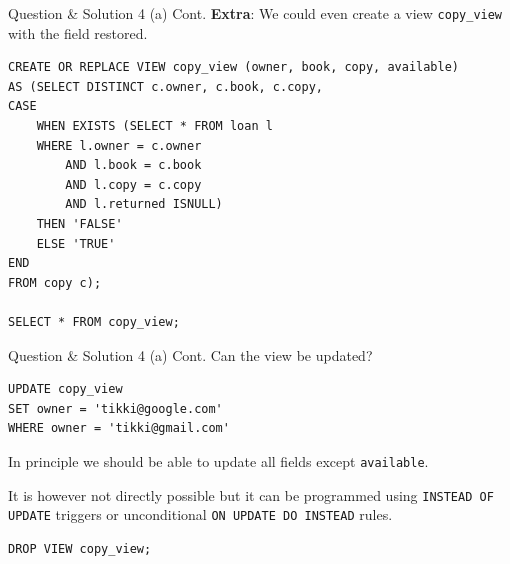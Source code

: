 \begin{frame}[fragile]{Question \& Solution 4 (a) Cont.}
\textbf{Extra}: We could even create a view \texttt{copy\_view} with the field restored.

\begin{lstlisting}
CREATE OR REPLACE VIEW copy_view (owner, book, copy, available) 
AS (SELECT DISTINCT c.owner, c.book, c.copy, 
CASE
	WHEN EXISTS (SELECT * FROM loan l  
	WHERE l.owner = c.owner
		AND l.book = c.book
		AND l.copy = c.copy 
		AND l.returned ISNULL) 
	THEN 'FALSE'
	ELSE 'TRUE' 
END
FROM copy c);

SELECT * FROM copy_view;
\end{lstlisting}

\end{frame}

\begin{frame}[fragile]{Question \& Solution 4 (a) Cont.}
Can the view be updated? 

\begin{lstlisting}
UPDATE copy_view 
SET owner = 'tikki@google.com' 
WHERE owner = 'tikki@gmail.com'
\end{lstlisting}

In principle we should be able to update all fields except \texttt{available}.  \vspace{10pt}

It is however not directly possible but it can be programmed using \texttt{INSTEAD OF UPDATE} triggers or  unconditional \texttt{ON UPDATE DO INSTEAD} rules.

\begin{lstlisting}
DROP VIEW copy_view;
\end{lstlisting}
\end{frame}

